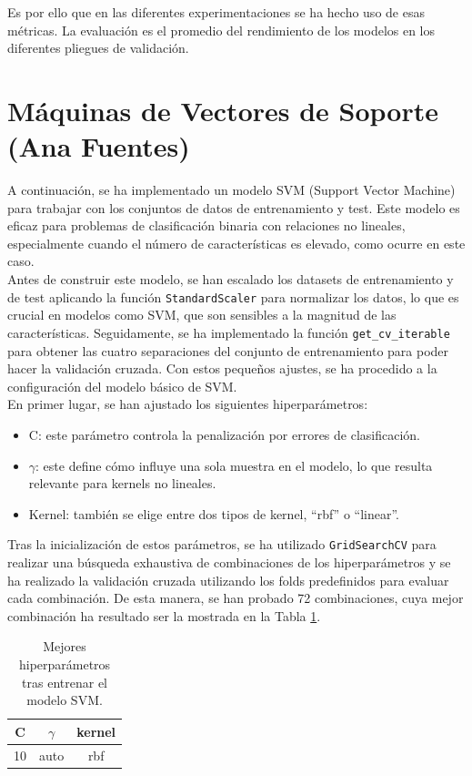 \documentclass[12pt,letterpaper]{article}
\begin{document}
Es por ello que en las diferentes experimentaciones se ha hecho uso de esas métricas. La evaluación es el promedio del rendimiento de los modelos en los diferentes pliegues de validación. 

\section{Máquinas de Vectores de Soporte (Ana Fuentes)}
A continuación, se ha implementado un modelo SVM (Support Vector Machine) para trabajar con los conjuntos de datos de entrenamiento y test. Este modelo es eficaz para problemas de clasificación binaria con relaciones no lineales, especialmente cuando el número de características es elevado, como ocurre en este caso.\\
Antes de construir este modelo, se han escalado los datasets de entrenamiento y de test aplicando la función \texttt{StandardScaler} para normalizar los datos, lo que es crucial en modelos como SVM, que son sensibles a la magnitud de las características. Seguidamente, se ha implementado la función \texttt{get\_cv\_iterable} para obtener las cuatro separaciones del conjunto de entrenamiento para poder hacer la validación cruzada. Con estos pequeños ajustes, se ha procedido a la configuración del modelo básico de SVM. \\

En primer lugar, se han ajustado los siguientes hiperparámetros:
\begin{itemize}
    \item C: este parámetro controla la penalización por errores de clasificación.
    \item $\gamma$: este define cómo influye una sola muestra en el modelo, lo que resulta relevante para kernels no lineales.
    \item Kernel: también se elige entre dos tipos de kernel, ``rbf'' o ``linear''.
\end{itemize}

Tras la inicialización de estos parámetros, se ha utilizado \texttt{GridSearchCV} para realizar una búsqueda exhaustiva de combinaciones de los hiperparámetros y se ha realizado la validación cruzada utilizando los folds predefinidos para evaluar cada combinación. De esta manera, se han probado 72 combinaciones, cuya mejor combinación ha resultado ser la mostrada en la Tabla \ref{tab:hiper-SVM}.
\begin{table}[H]
    \centering
    \begin{tabular}{|c|c|c|}
     \hline
     C & $\gamma$ & kernel \\ \hline
     10 & auto & rbf \\ \hline
    \end{tabular}
    \caption{Mejores hiperparámetros tras entrenar el modelo SVM.}
    \label{tab:hiper-SVM}
\end{table}
\end{document}

